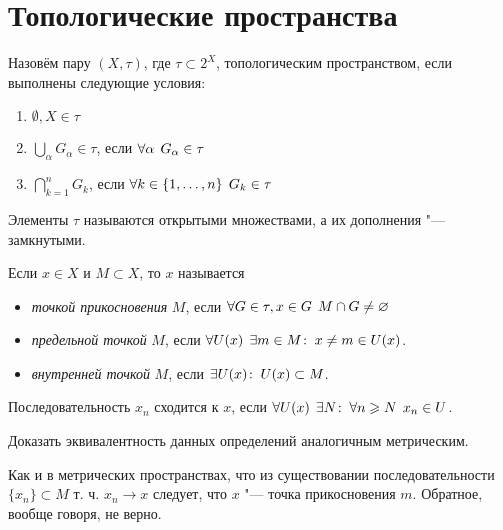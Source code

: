 \documentclass[main]{subfiles}
\begin{document}
\section{Топологические пространства}

\begin{definition}
  Назовём пару \( (X, \tau) \), где \( \tau \subset 2^X \),
  топологическим пространством, если выполнены следующие
  условия:
  \begin{enumerate}
    \item \( \emptyset, X \in \tau \)
    \item \( \bigcup_\alpha G_\alpha \in \tau \), если
      \( \forall {\alpha} \; \, G_\alpha \in \tau \)
    \item \( \bigcap_{k = 1}^n G_k \), если
      \( \forall {k \in \{ 1, \dots, n \}} \; \, G_k \in \tau \)
  \end{enumerate}
  Элементы \( \tau \) называются открытыми множествами,
  а их дополнения "--- замкнутыми.
\end{definition}

\begin{definition}
  Если \( x \in X \) и \( M \subset X \), то \( x \)
  называется
  \begin{itemize}
    \item \emph{точкой прикосновения} \( M \), если
      \( \forall {G \in \tau, x \in G} \; \, M \cap G \ne \varnothing \)
    \item \emph{предельной точкой} \( M \), если
      \( \forall {U(x)} \; \, \exists m \in M \colon \: x \ne m \in U(x) \).
    \item \emph{внутренней точкой} \( M \), если
      \( \exists U(x) \colon \: U(x) \subset M \).
  \end{itemize}
\end{definition}

\begin{definition}
  Последовательность \( x_n \) сходится к \( x \), если
  \( \forall {U(x)} \; \, \exists N \colon \: \forall {n \geqslant N} \; \, x_n \in U \).
\end{definition}

\begin{exercise}
  Доказать эквивалентность данных определений аналогичным
  метрическим.
\end{exercise}

\begin{remark}
  Как и в метрических пространствах,
  что из существовании последовательности
  \( \{ x_n \} \subset M \) т. ч. \( x_n \to x \)
  следует, что \( x \) "--- точка прикосновения \( m \).
  Обратное, вообще говоря, не верно.
\end{remark}
\end{document}
